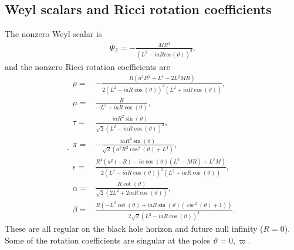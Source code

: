 \documentclass[12pt]{report}
\begin{document}
\subsection{Weyl scalars and Ricci rotation coefficients}
	The nonzero Weyl scalar is
\begin{align}
	\Psi_2
	=
	-\frac{
		MR^3
	}{
		\left(L^2 - iaR\mathrm{cos}\left(\vartheta\right)\right)^3
	}
	.
\end{align}
	and the nonzero Ricci rotation coefficients are
\begin{subequations}
\label{eq:NP_IEF_HC}.
\begin{align}
	\rho
	= &
	-\frac{R \left(a^2 R^2+L^4-2 L^2 M R\right)}{2 \left(L^2-i a R \cos (\vartheta )\right)^2 \left(L^2+i a R \cos (\vartheta )\right)}
	, \\
	\mu
	= &
	\frac{R}{-L^2+i a R \cos (\vartheta )}
	, \\
	\tau
	= &
	\frac{i a R^2 \sin (\vartheta )}{\sqrt{2} \left(L^2-i a R \cos (\vartheta )\right)^2}
	, \\
	\pi
	= &
	-\frac{i a R^2 \sin (\vartheta )}{\sqrt{2} \left(a^2 R^2 \cos ^2(\vartheta )+L^4\right)}
	, \\
	\epsilon
	= &
	\frac{R^2 \left(a^2 (-R)-i a \cos (\vartheta ) \left(L^2-M R\right)+L^2 M\right)}{2 \left(L^2-i a R \cos (\vartheta )\right)^2 \left(L^2+i a R \cos (\vartheta )\right)}
	, \\
	\alpha
	= &
	\frac{R \cot (\vartheta )}{\sqrt{2} \left(2 L^2+2 i a R \cos (\vartheta )\right)}
	, \\
	\beta
	= &
	\frac{R \left(-L^2 \cot (\vartheta )+i a R \sin (\vartheta ) \left(\csc ^2(\vartheta )+1\right)\right)}{2 \sqrt{2} \left(L^2-i a R \cos (\vartheta )\right)^2}
	.
\end{align}
\end{subequations}
	These are all regular on the black hole horizon and future null
infinity ($R=0$). Some of the rotation coefficients are singular
at the poles $\vartheta=0,\varpi$.


\end{document}
